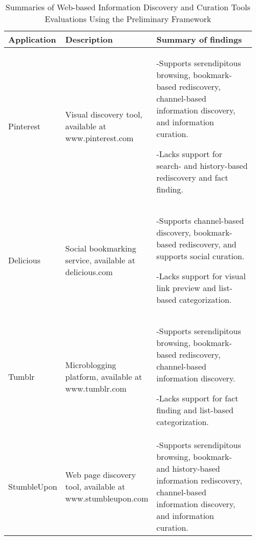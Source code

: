 \label{chapter:appendix_tools}
\begin{longtable}{|p{0.16\linewidth}| p{0.30\linewidth}| p{0.50\linewidth}|}
\caption{Summaries of Web-based Information Discovery and Curation Tools Evaluations Using the Preliminary Framework} \\

\hline
Application     & Description                                                                  & Summary of findings                                                                                                                                                                                                                                                                                            
\\
\hline
Pinterest       & \raggedright
Visual discovery tool, available at www.pinterest.com                        &
-\hspace{0.4cm}Supports serendipitous browsing, bookmark-based rediscovery, channel-based information discovery, and information curation. 


-\hspace{0.4cm}Lacks support for search- and history-based rediscovery and fact finding.                                                                       \\
\hline
Delicious       & \raggedright
Social bookmarking service, available at delicious.com &                                                                -\hspace{0.4cm}Supports channel-based discovery, bookmark-based rediscovery, and supports social curation. 

-\hspace{0.4cm}Lacks support for visual link preview and list-based categorization. \\
\hline
Tumblr          & \raggedright Microblogging platform, available at www.tumblr.com                         &-\hspace{0.4cm}Supports serendipitous browsing, bookmark-based rediscovery, channel-based information discovery.

-\hspace{0.4cm}Lacks support for fact finding and list-based categorization.                                                                                                 \\
\hline
StumbleUpon     & \raggedright Web page discovery tool, available at www.stumbleupon.com                    & -\hspace{0.4cm}Supports serendipitous browsing, bookmark- and history-based information rediscovery, channel-based information discovery, and information curation. 


\end{longtable}
